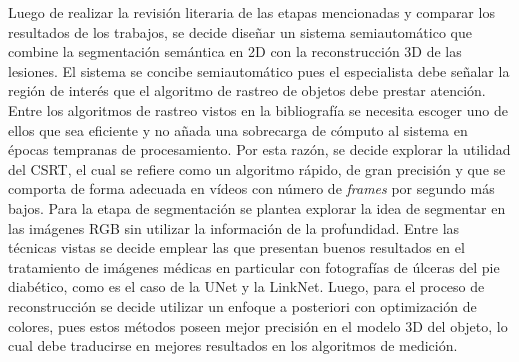 Luego de realizar la revisión literaria de las etapas mencionadas y comparar los resultados de los trabajos, se decide diseñar un sistema semiautomático que combine la segmentación semántica en 2D con la reconstrucción 3D de las lesiones. El sistema se concibe semiautomático pues el especialista debe señalar la región de interés que el algoritmo de rastreo de objetos debe prestar atención. Entre los algoritmos de rastreo vistos en la bibliografía se necesita escoger uno de ellos que sea eficiente y no añada una sobrecarga de cómputo al sistema en épocas tempranas de procesamiento. Por esta razón, se decide explorar la utilidad del CSRT, el cual se refiere como un algoritmo rápido, de gran precisión y que se comporta de forma adecuada en vídeos con número de \textit{frames} por segundo más bajos. Para la etapa de segmentación se plantea explorar la idea de segmentar en las imágenes RGB sin utilizar la información de la profundidad. Entre las técnicas vistas se decide emplear las que presentan buenos resultados en el tratamiento de imágenes médicas en particular con fotografías de úlceras del pie diabético, como es el caso de la UNet y la LinkNet. Luego, para el proceso de reconstrucción se decide utilizar un enfoque a posteriori con optimización de colores, pues estos métodos poseen mejor precisión en el modelo 3D del objeto, lo cual debe traducirse en mejores resultados en los algoritmos de medición.

